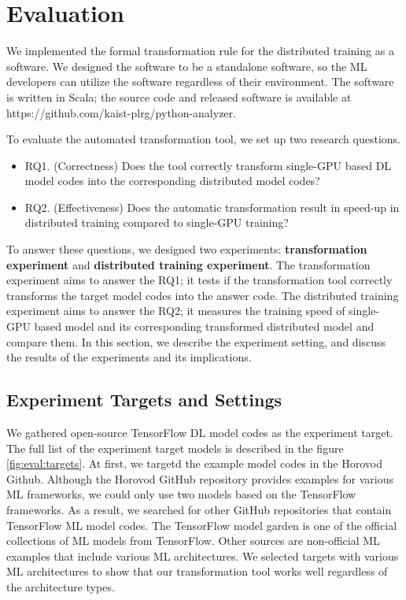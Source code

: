 \section{Evaluation}\label{sec:eval}

We implemented the formal transformation rule for the distributed training
as a software. We designed the software to be a standalone software, so 
the ML developers can utilize the software regardless of their environment. 
The software is written in Scala; the source code and released software
is available at https://github.com/kaist-plrg/python-analyzer.

To evaluate the automated transformation tool, we set up two research
questions.

\begin{itemize}
\item RQ1. (Correctness) Does the tool correctly transform single-GPU based DL model codes into
the corresponding distributed model codes?

\item RQ2. (Effectiveness) Does the automatic transformation result in speed-up 
in distributed training compared to single-GPU training?
\end{itemize}

To answer these questions,  
we designed two experiments: \textbf{transformation experiment} and
\textbf{distributed training experiment}.
The transformation experiment aims to answer the RQ1; it tests if the
transformation tool correctly transforms the target model codes into
the answer code.
The distributed training experiment aims to answer the RQ2;
it measures the training speed of single-GPU based model and its
corresponding transformed distributed model and compare them.
In this section, we describe the experiment setting,
and discuss the results of the experiments and its implications.

\pagebreak
\subsection{Experiment Targets and Settings}

We gathered open-source TensorFlow DL model codes as the experiment target.
The full list of the experiment target models is described in the
figure \ref{fig:eval:targets}.
At first, we targetd the example model codes in the Horovod 
Github\cite{horovodgithub}. Although the Horovod GitHub repository provides
examples for various ML frameworks, we could only use two models based on the
TensorFlow frameworks. As a result, we searched for other GitHub repositories
that contain TensorFlow ML model codes.
The TensorFlow model garden\cite{tfmodelgarden} is one of the official
collections of ML models from TensorFlow.
Other sources\cite{tfexamplesdamien}\cite{cifar10github}\cite{tf2tutogithub} are
non-official ML examples that include various ML architectures.
We selected targets with various ML architectures to show that
our transformation tool works well regardless of the architecture types.

